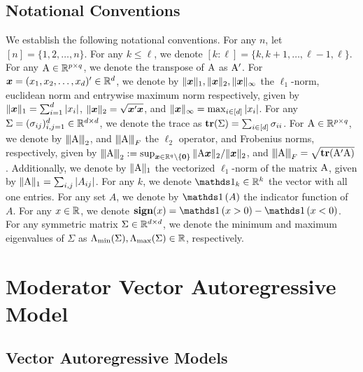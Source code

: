 \subsection*{Notational Conventions} 

We establish the following notational conventions. For any $n$, let $[n] = \{1,2,\ldots ,n\}$. For any $k\leq \ell$, we denote $[k : \ell] = \{k,k+1,\ldots, \ell-1, \ell\}$. For any $\mathrm{A} \in\mathbb{R}^{p\times q}$, we denote the transpose of $\mathrm{A}$ as $\mathrm{A}'$. For $\bm{x}= (x_1,x_2,\ldots ,x_d)'\in\mathbb{R}^{d}$, we denote by $\|\bm{x}\|_1, \|\bm{x}\|_2, \|\bm{x}\|_{\infty}$ the $\ell_1$-norm, euclidean norm and entrywise maximum norm respectively, given by $\|\bm{x}\|_1 = \sum_{i=1}^d |x_i|$, $\|\bm{x}\|_2 = \sqrt{\bm{x}'\bm{x}}$, and $\|\bm{x}\|_\infty = \max_{i\in[d]} |x_i|$. For any $\Sigma= (\sigma_{ij})_{i,j=1}^d\in\mathbb{R}^{d\times d}$, we denote the trace as $\textbf{tr}(\Sigma) = \sum_{i\in[d]} \sigma_{ii}$. For $\mathrm{A} \in\mathbb{R}^{p\times q}$, we denote by ${\left\vert\kern-0.25ex\left\vert\kern-0.25ex\left\vert \mathrm{A} \right\vert\kern-0.25ex\right\vert\kern-0.25ex\right\vert}_2$, and ${\left\vert\kern-0.25ex\left\vert\kern-0.25ex\left\vert \mathrm{A} \right\vert\kern-0.25ex\right\vert\kern-0.25ex\right\vert}_F$  the $\ell_2$ operator,  and Frobenius norms, respectively, given by ${\left\vert\kern-0.25ex\left\vert\kern-0.25ex\left\vert \mathrm{A} \right\vert\kern-0.25ex\right\vert\kern-0.25ex\right\vert}_2 := \sup_{\bm{x}\in\mathbb{R}^{q}\setminus\{{\mathbf{0}}\}} \|\mathrm{A} \bm{x}\|_2 / \|\bm{x}\|_2$, and ${\left\vert\kern-0.25ex\left\vert\kern-0.25ex\left\vert \mathrm{A} \right\vert\kern-0.25ex\right\vert\kern-0.25ex\right\vert}_F = \sqrt{\textbf{tr}(\mathrm{A}'\mathrm{A})}$. Additionally, we denote by $\|\mathrm{A}\|_{1}$ the vectorized $\ell_1$-norm of the matrix $\mathrm{A}$, given by $\|\mathrm{A}\|_1 = \sum_{i,j}|A_{ij}|$. For any $k$, we denote $\indv{k}\in\bbR^{k}$ the vector with all one entries. For any set $A$, we denote by $\ind{A}$ the indicator function of $A$. For any $x\in\mathbb{R}$, we denote $\bsign(x) = \ind{x> 0} - \ind{x<0}$. For any symmetric matrix $\Sigma\in\mathbb{R}^{d\times d}$, we denote the minimum and maximum eigenvalues of $\Sigma$ as $\Lambda_{\min}(\Sigma),\Lambda_{\max}(\Sigma)\in\mathbb{R}$, respectively.




\section{Moderator Vector Autoregressive Model}\label{section:mod-var}




\subsection{Vector Autoregressive Models}

